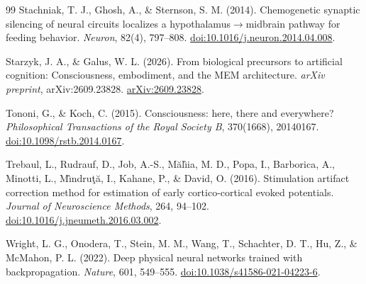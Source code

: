 \begin{thebibliography}{99}
 Stachniak, T. J., Ghosh, A., \& Sternson, S. M. (2014). Chemogenetic synaptic silencing of neural circuits localizes a hypothalamus$\to$midbrain pathway for feeding behavior. \textit{Neuron}, 82(4), 797--808. \href{https://doi.org/10.1016/j.neuron.2014.04.008}{doi:10.1016/j.neuron.2014.04.008}.

 Starzyk, J. A., \& Galus, W. L. (2026). From biological precursors to artificial cognition: Consciousness, embodiment, and the MEM architecture. \textit{arXiv preprint}, arXiv:2609.23828. \href{https://arxiv.org/abs/2609.23828}{arXiv:2609.23828}.

 Tononi, G., \& Koch, C. (2015). Consciousness: here, there and everywhere? \textit{Philosophical Transactions of the Royal Society B}, 370(1668), 20140167. \href{https://doi.org/10.1098/rstb.2014.0167}{doi:10.1098/rstb.2014.0167}.

 Trebaul, L., Rudrauf, D., Job, A.-S., M\u{a}l\^{\i}ia, M. D., Popa, I., Barborica, A., Minotti, L., M\^{\i}ndru\c{t}\u{a}, I., Kahane, P., \& David, O. (2016). Stimulation artifact correction method for estimation of early cortico-cortical evoked potentials. \textit{Journal of Neuroscience Methods}, 264, 94--102. \href{https://doi.org/10.1016/j.jneumeth.2016.03.002}{doi:10.1016/j.jneumeth.2016.03.002}.

 Wright, L. G., Onodera, T., Stein, M. M., Wang, T., Schachter, D. T., Hu, Z., \& McMahon, P. L. (2022). Deep physical neural networks trained with backpropagation. \textit{Nature}, 601, 549--555. \href{https://doi.org/10.1038/s41586-021-04223-6}{doi:10.1038/s41586-021-04223-6}.

\end{thebibliography}
